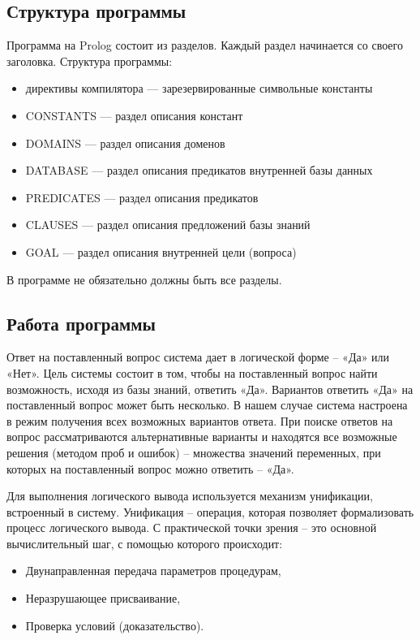 \subsection*{Структура программы}

Программа на Prolog состоит из разделов. Каждый раздел начинается со своего 
заголовка. Структура программы:

\begin{itemize}
	\item директивы компилятора — зарезервированные символьные константы
	\item CONSTANTS — раздел описания констант
	\item DOMAINS — раздел описания доменов
	\item DATABASE — раздел описания предикатов внутренней базы данных
	\item PREDICATES — раздел описания предикатов
	\item CLAUSES — раздел описания предложений базы знаний
	\item GOAL — раздел описания внутренней цели (вопроса)
\end{itemize}

В программе не обязательно должны быть все разделы.

\subsection*{Работа программы}

Ответ на поставленный вопрос система дает в логической форме -- «Да» или «Нет». Цель системы состоит в том, чтобы на поставленный вопрос найти возможность, исходя из базы знаний, ответить «Да». Вариантов ответить «Да» на поставленный вопрос может быть несколько. В нашем случае система настроена в режим получения всех возможных вариантов ответа. При поиске ответов на вопрос рассматриваются альтернативные варианты и находятся все возможные решения (методом проб и ошибок) -- множества значений переменных, при которых на поставленный вопрос можно ответить -- «Да».

Для выполнения логического вывода используется механизм унификации, встроенный в систему.
Унификация -- операция, которая позволяет формализовать процесс логического вывода. С практической точки зрения -- это основной вычислительный шаг, с помощью которого происходит:
\begin{itemize}
	\item Двунаправленная передача параметров процедурам,
	\item Неразрушающее присваивание,
	\item Проверка условий (доказательство).
\end{itemize}

